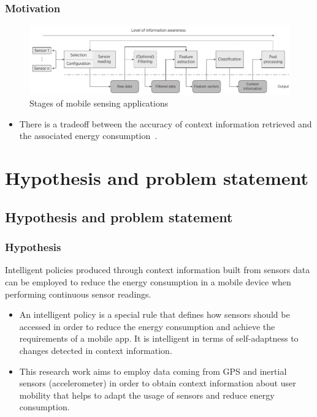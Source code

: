\documentclass[compress,9pt,xcolor={dvipsnames,table}]{beamer}
\begin{document}
\begin{frame}\frametitle{Motivation}

\begin{figure}[tb]
  \centering
  \includegraphics[width=\textwidth]{../../../resources/images/vectors/msa-stages}
  \caption{Stages of mobile sensing applications}
  \label{fig:msa-stages}
\end{figure}

\begin{itemize}
  \item There is a tradeoff between the accuracy of context information retrieved and the associated energy consumption~\cite{Sim2014,Rachuri2012}.
\end{itemize}
\end{frame}


\section{Hypothesis and problem statement}
\subsection{Hypothesis and problem statement}
\begin{frame}\frametitle{Hypothesis}
\begin{tcolorbox}[title=Hypothesis,colframe=PineGreen]
Intelligent policies produced through context information built from sensors data can be employed to reduce the energy consumption in a mobile device when performing continuous sensor readings.
\end{tcolorbox}

{
\small
\begin{itemize}
	\item An intelligent policy is a special rule that defines how sensors should be accessed in order to reduce the energy consumption and achieve the requirements of a mobile app.
	It is intelligent in terms of self-adaptness to changes detected in context information.
	\item This research work aims to employ data coming from GPS and inertial sensors (accelerometer) in order to obtain context information about user mobility that helps to adapt the usage of sensors and reduce energy consumption.
\end{itemize}
}
\end{frame}
\end{document}
